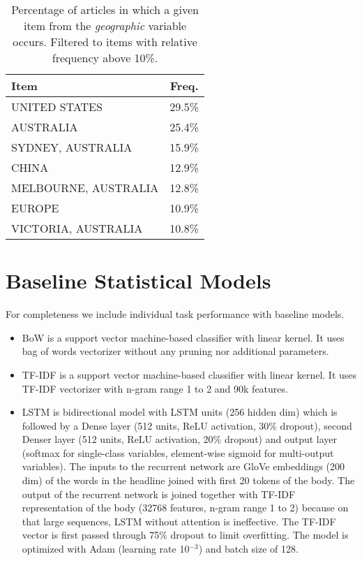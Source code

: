 \begin{table}[ht]
\centering
\begin{tabular}{lc}
\toprule
Item & Freq. \\
\midrule
UNITED STATES & 29.5\% \\
AUSTRALIA & 25.4\% \\
SYDNEY, AUSTRALIA & 15.9\% \\
CHINA & 12.9\% \\
MELBOURNE, AUSTRALIA & 12.8\% \\
EUROPE & 10.9\% \\
VICTORIA, AUSTRALIA & 10.8\% \\
\bottomrule
\end{tabular}
\caption{Percentage of articles in which a given item from the \emph{geographic} variable occurs. Filtered to items with relative frequency above 10\%.}
\label{tab:dist_geographic}
\end{table}

\clearpage

\section{Baseline Statistical Models} \label{subsubsec:baselines}

For completeness we include individual task performance with baseline models.
\begin{itemize}[leftmargin=0.4cm,noitemsep]
\item
BoW is a support vector machine-based classifier with linear kernel.
It uses bag of words vectorizer without any pruning nor additional parameters.
\item
TF-IDF is a support vector machine-based classifier with linear kernel.
It uses TF-IDF vectorizer with n-gram range 1 to 2 and 90k features.
\item
LSTM is bidirectional model with LSTM units (256 hidden dim) which is followed by a Dense layer (512 units, ReLU activation, 30\% dropout), second Denser layer (512 units, ReLU activation, 20\% dropout) and output layer (softmax for single-class variables, element-wise sigmoid for multi-output variables).
The inputs to the recurrent network are GloVe embeddings (200 dim) of the words in the headline joined with first 20 tokens of the body. 
The output of the recurrent network is joined together with TF-IDF representation of the body (32768 features, n-gram range 1 to 2) because on that large sequences, LSTM without attention is ineffective.
The TF-IDF vector is first passed through 75\% dropout to limit overfitting.
The model is optimized with Adam (learning rate 10$^{-3}$) and batch size of 128.
\end{itemize}

